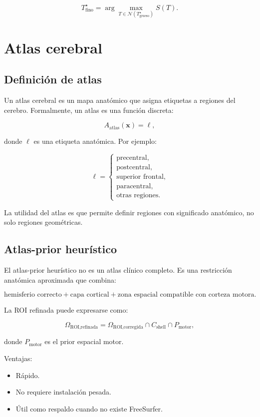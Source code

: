 \documentclass[12pt,a4paper]{article}
\begin{document}
\[
T^\star_{\text{fino}}
=
\arg\max_{T\in\mathcal{N}(T^\star_{\text{grueso}})} S(T).
\]

\section{Atlas cerebral}

\subsection{Definición de atlas}

Un atlas cerebral es un mapa anatómico que asigna etiquetas a regiones del cerebro. Formalmente, un atlas es una función discreta:

\[
A_{\text{atlas}}(\mathbf{x}) = \ell,
\]

donde \(\ell\) es una etiqueta anatómica. Por ejemplo:

\[
\ell=
\begin{cases}
\text{precentral},\\
\text{postcentral},\\
\text{superior frontal},\\
\text{paracentral},\\
\text{otras regiones}.
\end{cases}
\]

La utilidad del atlas es que permite definir regiones con significado anatómico, no solo regiones geométricas.

\subsection{Atlas-prior heurístico}

El atlas-prior heurístico no es un atlas clínico completo. Es una restricción anatómica aproximada que combina:

\[
\text{hemisferio correcto}
+
\text{capa cortical}
+
\text{zona espacial compatible con corteza motora}.
\]

La ROI refinada puede expresarse como:

\[
\Omega_{\text{ROI,refinada}}
=
\Omega_{\text{ROI,corregida}}
\cap
C_{\text{shell}}
\cap
P_{\text{motor}},
\]

donde \(P_{\text{motor}}\) es el prior espacial motor.

Ventajas:

\begin{itemize}
    \item Rápido.
    \item No requiere instalación pesada.
    \item Útil como respaldo cuando no existe FreeSurfer.
\end{itemize}
\end{document}
